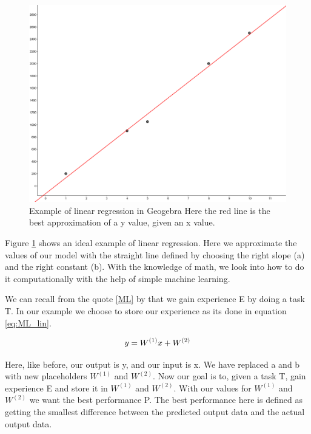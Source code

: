 \begin{figure}[h]
\centering
\includegraphics[scale=0.1]{background/figures/linear_regression.png}
\caption{Example of linear regression in Geogebra Here the red line is the best approximation of a y value, given an x value.} 
\label{fig:geogebra}
\end{figure} %
Figure \ref{fig:geogebra} shows an ideal example of linear regression. Here we approximate the values of our model with the straight line defined by choosing the right slope (a) and the right constant (b).
With the knowledge of math, we look into how to do it computationally with the help of simple machine learning. 


We can recall from the quote \ref{ML} by \cite{MitchellTomM1997Ml} that we gain experience E by doing a task T. In our example we choose to store our experience as its done in equation \ref{eq:ML_lin}.
    
\begin{equation}
y=W^{(1)}x+W^{(2)}\\
\label{eq:ML_lin}
\end{equation}

Here, like before, our output is y, and our input is x. We have replaced a and b with new placeholders $W^{(1)}$ and $W^{(2)}$.
Now our goal is to, given a task T, gain experience E and store it in $W^{(1)}$ and $W^{(2)}$. With our values for $W^{(1)}$ and $W^{(2)}$ we want the best performance P.  The best performance here is defined as getting the smallest difference between the predicted output data and the actual output data. 


